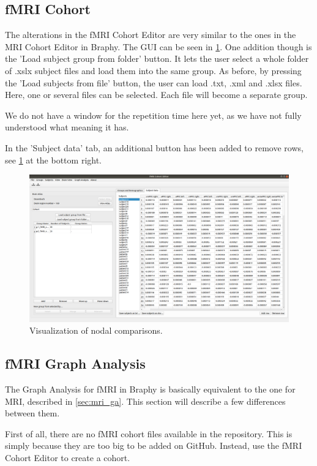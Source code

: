 \documentclass{article}
\begin{document}
\subsection{fMRI Cohort}

The alterations in the fMRI Cohort Editor are very similar to the ones in the MRI Cohort Editor in Braphy. The GUI can be seen in \cref{fig:fmri_cohort}. One addition though is the 'Load subject group from folder' button. It lets the user select a whole folder of .xslx subject files and load them into the same group. As before, by pressing the 'Load subjects from file' button, the user can load .txt, .xml and .xlsx files. Here, one or several files can be selected. Each file will become a separate group. 

We do not have a window for the repetition time here yet, as we have not fully understood what meaning it has.

In the 'Subject data' tab, an additional button has been added to remove rows, see \cref{fig:fmri_cohort} at the bottom right.

\begin{figure}[H]
    \centering
    \includegraphics[width=\linewidth]{fmri_cohort.png}
    \caption{Visualization of nodal comparisons.}
    \label{fig:fmri_cohort}
\end{figure}

\subsection{fMRI Graph Analysis}

The Graph Analysis for fMRI in Braphy is basically equivalent to the one for MRI, described in \cref{sec:mri_ga}. This section will describe a few differences between them. 

First of all, there are no fMRI cohort files available in the repository. This is simply because they are too big to be added on GitHub. Instead, use the fMRI Cohort Editor to create a cohort.
\end{document}

